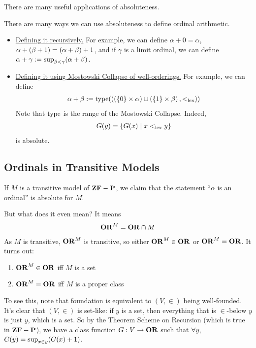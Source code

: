 There are many useful applications of absoluteness.

\begin{boxexample}
    There are many ways we can use absoluteness to define ordinal arithmetic.
    \begin{itemize}
        \item \underline{Defining it recursively.} For example, we can define $\alpha + 0 = \alpha$, $\alpha + \left( \beta + 1 \right) = \left( \alpha + \beta \right) + 1$, and if $\gamma$ is a limit ordinal, we can define $\alpha + \gamma := \sup_{\beta < \gamma}\!\left( \alpha + \beta \right)$.

        \item \underline{Defining it using Mostowski Collapse of well-orderings.} For example, we can define
        \begin{align*}
            \alpha + \beta :=
            \operatorname{type}\!\left( \left( \left( \left\{ 0 \right\} \times \alpha \right) \cup \left( \left\{ 1 \right\} \times \beta \right), <_{\operatorname{lex}} \right) \right)
        \end{align*}
        Note that $\operatorname{type}$ is the range of the Mostowski Collapse. Indeed,
        \begin{align*}
            G(y) = \left\{ G(x) \; \middle\vert \; x <_{\operatorname{lex}} y \right\}
        \end{align*}
        is absolute.
    \end{itemize}
\end{boxexample}

\subsection{Ordinals in Transitive Models} \label{Ch3:Subsec:Ordinals}


If $M$ is a transitive model of $\mathbf{ZF} - \mathbf{P}$, we claim that the statement ``$\alpha$ is an ordinal'' is absolute for $M$. %

But what does it even mean? It means
\begin{align*}
    \mathbf{OR}^M = \mathbf{OR} \cap M
\end{align*}
As $M$ is transitive, $\mathbf{OR}^M$ is transitive, so either $\mathbf{OR}^M \in \mathbf{OR}$ or $\mathbf{OR}^M = \mathbf{OR}$. It turns out:
\begin{enumerate}
    \item $\mathbf{OR}^M \in \mathbf{OR}$ iff $M$ is a set
    \item $\mathbf{OR}^M = \mathbf{OR}$ iff $M$ is a proper class
\end{enumerate}
To see this, note that foundation is equivalent to $(V, \in)$ being well-founded. It's clear that $(V, \in)$ is set-like: if $y$ is a set, then everything that is $\in$-below $y$ is just $y$, which is a set. So by the Theorem Scheme on Recursion (which is true in $\mathbf{ZF} - \mathbf{P}$), we have a class function $G : V \to \mathbf{OR}$ such that $\forall y$, $G(y) = \sup_{x \in y}\!\left( G(x) + 1 \right)$.

